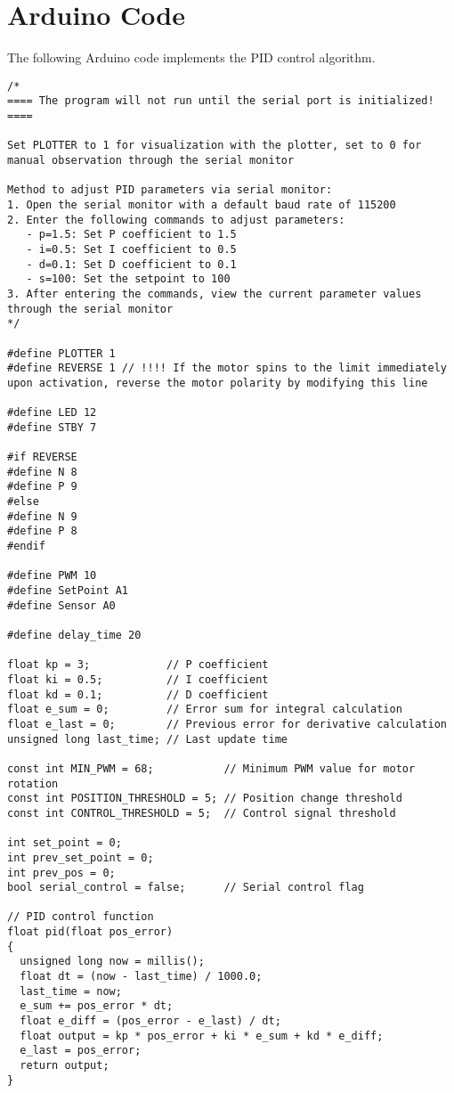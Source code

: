\documentclass{article}
\begin{document}
\section{Arduino Code}
The following Arduino code implements the PID control algorithm.

\begin{verbatim}
/*
==== The program will not run until the serial port is initialized! ====

Set PLOTTER to 1 for visualization with the plotter, set to 0 for manual observation through the serial monitor

Method to adjust PID parameters via serial monitor:
1. Open the serial monitor with a default baud rate of 115200
2. Enter the following commands to adjust parameters:
   - p=1.5: Set P coefficient to 1.5
   - i=0.5: Set I coefficient to 0.5
   - d=0.1: Set D coefficient to 0.1
   - s=100: Set the setpoint to 100
3. After entering the commands, view the current parameter values through the serial monitor
*/

#define PLOTTER 1
#define REVERSE 1 // !!!! If the motor spins to the limit immediately upon activation, reverse the motor polarity by modifying this line

#define LED 12
#define STBY 7

#if REVERSE
#define N 8
#define P 9
#else
#define N 9
#define P 8
#endif

#define PWM 10
#define SetPoint A1
#define Sensor A0

#define delay_time 20

float kp = 3;            // P coefficient
float ki = 0.5;          // I coefficient
float kd = 0.1;          // D coefficient
float e_sum = 0;         // Error sum for integral calculation
float e_last = 0;        // Previous error for derivative calculation
unsigned long last_time; // Last update time

const int MIN_PWM = 68;           // Minimum PWM value for motor rotation
const int POSITION_THRESHOLD = 5; // Position change threshold
const int CONTROL_THRESHOLD = 5;  // Control signal threshold

int set_point = 0;
int prev_set_point = 0;
int prev_pos = 0;
bool serial_control = false;      // Serial control flag

// PID control function
float pid(float pos_error)
{
  unsigned long now = millis();
  float dt = (now - last_time) / 1000.0;
  last_time = now;
  e_sum += pos_error * dt;
  float e_diff = (pos_error - e_last) / dt;
  float output = kp * pos_error + ki * e_sum + kd * e_diff;
  e_last = pos_error;
  return output;
}


\end{verbatim}
\end{document}
